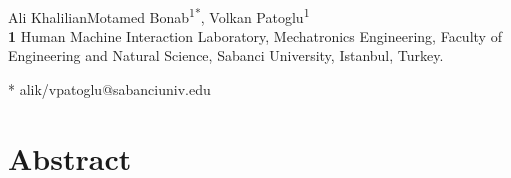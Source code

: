 \documentclass[10pt,letterpaper]{article}
\begin{document}
\vspace*{0.2in}

\begin{flushleft}
{\Large
\textbf{} %
}
\newline
\\
Ali KhalilianMotamed Bonab\textsuperscript{1*},
Volkan Patoglu\textsuperscript{1}
\\
\bigskip
\textbf{1} Human Machine Interaction Laboratory, Mechatronics Engineering, Faculty of Engineering and Natural Science, Sabanci University, Istanbul, Turkey.
\\
\bigskip

* alik/vpatoglu@sabanciuniv.edu

\end{flushleft}
\section*{Abstract}

\end{document}

